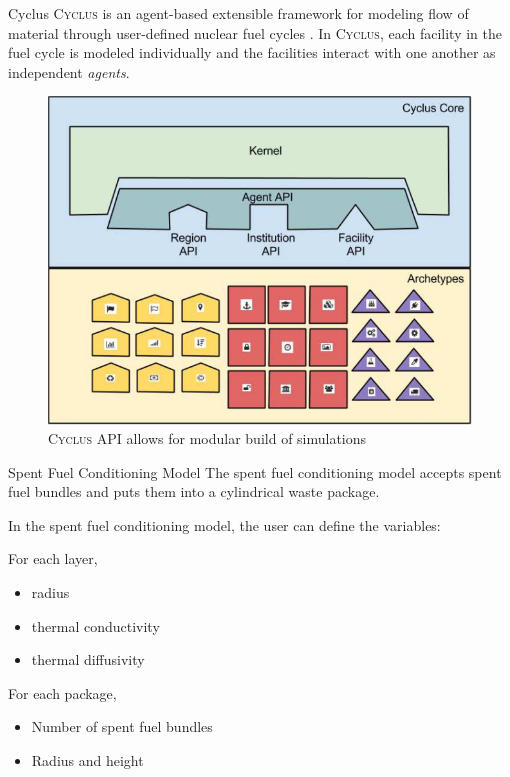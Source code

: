 \documentclass[final]{beamer}
\newlength{\onecolwid}
\newlength{\threecolwid}
\newcommand{\Cyclus}{\textsc{Cyclus}\xspace}%
\begin{document}
\begin{frame}[t]
\begin{columns}[t,totalwidth=\threecolwid]
\begin{column}{\onecolwid}
\begin{block}{Cyclus}
\Cyclus is an agent-based extensible framework for modeling flow of material 
through user-defined nuclear fuel cycles \cite{huff_fundamental_2016}. 
In \Cyclus, each facility in the fuel cycle is modeled individually 
and the facilities interact with one another as independent \textit{agents}. 
\begin{figure}
	\includegraphics[width=0.9\linewidth]{Cyclus_graph}
	\caption{\Cyclus API allows for modular build of simulations \cite{huff_fundamental_2016}}
\end{figure}

\end{block}

\begin{block}{Spent Fuel Conditioning Model}
The spent fuel conditioning model accepts spent fuel bundles and puts them into a cylindrical
waste package. 
	
In the spent fuel conditioning model, the user can define the variables:  

For each layer, 
\begin{itemize}
	\item radius 
	\item thermal conductivity 
	\item thermal diffusivity
\end{itemize}
For each package,
\begin{itemize}
	\item Number of spent fuel bundles
	\item Radius and height
\end{itemize}

\end{block}


\end{column}
\end{columns}
\end{frame}
\end{document}
